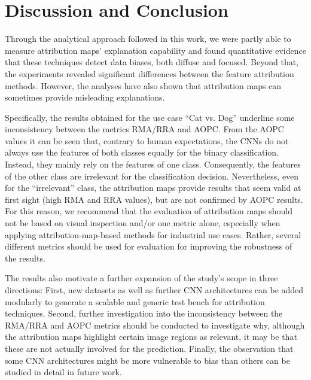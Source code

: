 \documentclass[runningheads]{llncs}
\begin{document}

\section{Discussion and Conclusion}

Through the analytical approach followed in this work, we were partly able to measure attribution maps' explanation capability and found quantitative evidence that these techniques detect data biases, both diffuse and focused. Beyond that, the experiments revealed significant differences between the feature attribution methods.
However, the analyses have also shown that attribution maps can sometimes provide misleading explanations.

Specifically, the results obtained for the use case \enquote{Cat vs. Dog} underline some inconsistency between the metrics RMA/RRA and AOPC. From the AOPC values it can be seen that, contrary to human expectations, the CNNs do not always use the features of both classes equally for the binary classification. Instead, they mainly rely on the features of one class.
Consequently, the features of the other class are irrelevant for the classification decision. Nevertheless, even for the \enquote{irrelevant} class, the attribution maps provide results that seem valid at first sight (high RMA and RRA values), but are not confirmed by AOPC results. For this reason, we recommend that the evaluation of attribution maps should not be based on visual inspection and/or one metric alone, especially when applying attribution-map-based methods for industrial use cases. Rather, several different metrics should be used for evaluation for improving the robustness of the results.

The results also motivate a further expansion of the study's scope in three directions: First, new datasets as well as further CNN architectures can be added modularly to generate a scalable and generic test bench for attribution techniques. Second, further investigation into the inconsistency between the RMA/RRA and AOPC metrics should be conducted to investigate why, although the attribution maps highlight certain image regions as relevant, it may be that these are not actually involved for the prediction. Finally, the observation that some CNN architectures might be more vulnerable to bias than others can be studied in detail in future work.
\end{document}
